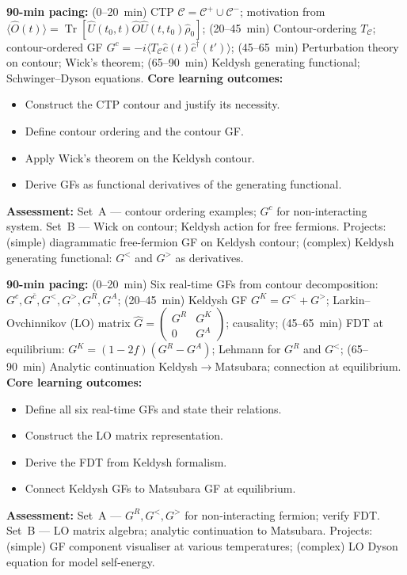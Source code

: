 \documentclass[11pt,a4paper]{article}
\begin{document}
\begin{tcolorbox}[modulebox, title={Module~II.5 --- Lecture L02: The Keldysh Contour}]
\textbf{90-min pacing:} (0--20~min) CTP $\mathcal{C}=\mathcal{C}^+\cup\mathcal{C}^-$; motivation from $\langle\hat{O}(t)\rangle=\operatorname{Tr}[\hat{U}(t_0,t)\hat{O}\hat{U}(t,t_0)\hat\rho_0]$; (20--45~min) Contour-ordering $T_\mathcal{C}$; contour-ordered GF $G^c=-i\langle T_\mathcal{C}\hat{c}(t)\hat{c}^\dagger(t')\rangle$; (45--65~min) Perturbation theory on contour; Wick's theorem; (65--90~min) Keldysh generating functional; Schwinger--Dyson equations.
\medskip\textbf{Core learning outcomes:}
\begin{itemize}[leftmargin=1.4em,topsep=2pt,itemsep=1pt]
  \item Construct the CTP contour and justify its necessity.
  \item Define contour ordering and the contour GF.
  \item Apply Wick's theorem on the Keldysh contour.
  \item Derive GFs as functional derivatives of the generating functional.
\end{itemize}
\medskip\textbf{Assessment:}
Set~A --- contour ordering examples; $G^c$ for non-interacting system.
Set~B --- Wick on contour; Keldysh action for free fermions.
Projects: (simple) diagrammatic free-fermion GF on Keldysh contour; (complex) Keldysh generating functional: $G^<$ and $G^>$ as derivatives.
\end{tcolorbox}

\medskip

\begin{tcolorbox}[modulebox, title={Module~II.5 --- Lecture L03: Contour-Ordered Green's Functions}]
\textbf{90-min pacing:} (0--20~min) Six real-time GFs from contour decomposition: $G^c,G^{\bar c},G^<,G^>,G^R,G^A$; (20--45~min) Keldysh GF $G^K=G^<+G^>$; Larkin--Ovchinnikov (LO) matrix $\hat{G}=\begin{pmatrix}G^R&G^K\\0&G^A\end{pmatrix}$; causality; (45--65~min) FDT at equilibrium: $G^K=(1-2f)(G^R-G^A)$; Lehmann for $G^R$ and $G^<$; (65--90~min) Analytic continuation Keldysh$\to$Matsubara; connection at equilibrium.
\medskip\textbf{Core learning outcomes:}
\begin{itemize}[leftmargin=1.4em,topsep=2pt,itemsep=1pt]
  \item Define all six real-time GFs and state their relations.
  \item Construct the LO matrix representation.
  \item Derive the FDT from Keldysh formalism.
  \item Connect Keldysh GFs to Matsubara GF at equilibrium.
\end{itemize}
\medskip\textbf{Assessment:}
Set~A --- $G^R,G^<,G^>$ for non-interacting fermion; verify FDT.
Set~B --- LO matrix algebra; analytic continuation to Matsubara.
Projects: (simple) GF component visualiser at various temperatures; (complex) LO Dyson equation for model self-energy.
\end{tcolorbox}
\end{document}
